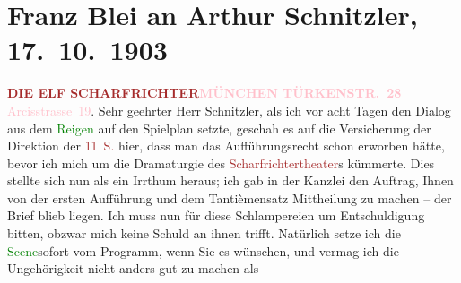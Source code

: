 

               \section[Franz Blei an Arthur Schnitzler, 17. 10. 1903]{ Franz Blei an Arthur Schnitzler, 17. 10. 1903}\nopagebreak{}\rehead{ }\normalsize\beginnumbering{} \toendnotes[C]{\smallbreak\pagebreak[2]} 
\toendnotes[C]{\smallbreak}\pstart
           \noindent{}\centering{}{\pb}\textcolor{gray}{\textbf{\textcolor{brown}{DIE ELF SCHARFRICHTER}{}\ledrightnote{\textcolor{brown}{Die elf Scharfrichter}}{ }\textcolor{pink}{MÜNCHEN TÜRKENSTR. 28}{}\ledrightnote{\textcolor{pink}{Türkenstraße}}}}\pend
           \pstart
           \noindent{}\raggedleft{}\textcolor{pink}{Arcisstrasse 19}{}\ledrightnote{\textcolor{pink}{Arcisstraße}}. \pend
           \pstart{}Sehr geehrter Herr Schnitzler,\pend\pstart
           als ich vor acht Tagen den Dialog aus dem \textcolor{green}{Reigen}{}\ledrightnote{\textcolor{green}{Reigen. Zehn Dialoge}}
               auf den Spielplan setzte, geschah es auf die Versicherung der Direktion der \textcolor{brown}{11 S.}{}\ledrightnote{\textcolor{brown}{Die elf Scharfrichter}} hier, dass man das Aufführungsrecht schon
               erworben hätte, bevor ich mich um die Dramaturgie des \textcolor{brown}{Scharfrichtertheater}{}\ledrightnote{\textcolor{brown}{Die elf Scharfrichter}}s kümmerte. Dies stellte sich nun als ein Irrthum
               heraus; ich gab in der Kanzlei den Auftrag, Ihnen von der ersten Aufführung und dem
               Tantièmensatz Mittheilung zu machen – der Brief blieb liegen. Ich muss nun für diese
               Schlampereien um Entschuldigung bitten, obzwar mich keine Schuld an ihnen trifft.
               Natürlich setze ich die \textcolor{green}{Scene}{}sofort vom Programm, wenn Sie es wünschen, und
               vermag ich die Ungehörigkeit {\pb}nicht anders gut zu machen als
